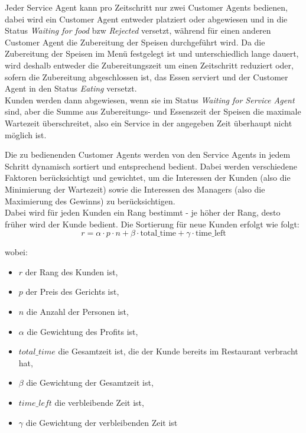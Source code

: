 Jeder Service Agent kann pro Zeitschritt nur zwei Customer Agents bedienen, dabei wird ein Customer Agent entweder platziert oder abgewiesen und in die Status \emph{Waiting for food} bzw \emph{Rejected} versetzt, während für einen anderen Customer Agent die Zubereitung der Speisen durchgeführt wird. Da die Zubereitung der Speisen im Menü festgelegt ist und unterschiedlich lange dauert, wird deshalb entweder die Zubereitungszeit um einen Zeitschritt reduziert oder, sofern die Zubereitung abgeschlossen ist, das Essen serviert und der Customer Agent in den Status \emph{Eating} versetzt.\\
Kunden werden dann abgewiesen, wenn sie im Status \emph{Waiting for Service Agent} sind, aber die Summe aus Zubereitungs- und Essenszeit der Speisen die maximale Wartezeit überschreitet, also ein Service in der angegeben Zeit überhaupt nicht möglich ist.

Die zu bedienenden Customer Agents werden von den Service Agents in jedem Schritt dynamisch sortiert und entsprechend bedient. Dabei werden verschiedene Faktoren berücksichtigt und gewichtet, um die Interessen der Kunden (also die Minimierung der Wartezeit) sowie die Interessen des Managers (also die Maximierung des Gewinns) zu berücksichtigen.\\
Dabei wird für jeden Kunden ein Rang bestimmt - je höher der Rang, desto früher wird der Kunde bedient. Die Sortierung für neue Kunden erfolgt wie folgt:
\begin{equation*}
    r = \alpha \cdot p \cdot n + \beta \cdot \text{total\_time} + \gamma \cdot \text{time\_left}
\end{equation*}

wobei:
\begin{itemize}
    \item $r$ der Rang des Kunden ist,
    \item $p$ der Preis des Gerichts ist,
    \item $n$ die Anzahl der Personen ist,
    \item $\alpha$ die Gewichtung des Profits ist,
    \item $total\_time$ die Gesamtzeit ist, die der Kunde bereits im Restaurant verbracht hat,
    \item $\beta$ die Gewichtung der Gesamtzeit ist,
    \item $time\_left$ die verbleibende Zeit ist,
    \item $\gamma$ die Gewichtung der verbleibenden Zeit ist
\end{itemize}

